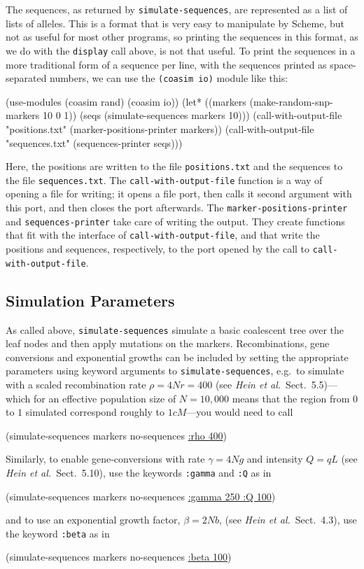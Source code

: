 \documentclass{manual}
\begin{document}
The sequences, as returned by \texttt{simulate-sequences}, are
represented as a list of lists of alleles.  This is a format that is
very easy to manipulate by Scheme, but not as useful for most other
programs, so printing the sequences in this format, as we do with the
\texttt{display} call above, is not that useful.  To print the
sequences in a more traditional form of a sequence per line, with the
sequences printed as space-separated numbers, we can use the
\texttt{(coasim io)} module like this:
\begin{code}
(use-modules (coasim rand) (coasim io))
(let* ((markers (make-random-snp-markers 10 0 1))
       (seqs (simulate-sequences markers 10)))
  (call-with-output-file "positions.txt" (marker-positions-printer markers))
  (call-with-output-file "sequences.txt" (sequences-printer seqs)))
\end{code}
Here, the positions are written to the file \texttt{positions.txt} and
the sequences to the file \texttt{sequences.txt}.  The
\texttt{call-with-output-file} function is a way of opening a file for
writing; it opens a file port, then calls it second argument with this
port, and then closes the port afterwards.  The
\texttt{marker-positions-printer} and \texttt{sequences-printer} take
care of writing the output.  They create functions that fit with the
interface of \texttt{call-with-output-file}, and that write the
positions and sequences, respectively, to the port opened by
the call to \texttt{call-with-output-file}.


\subsection{Simulation Parameters}
\label{sec:simul-param}

As called above, \texttt{simulate-sequences} simulate a basic
coalescent tree over the leaf nodes and then apply mutations on the
markers.  Recombinations, gene conversions and exponential growths can
be included by setting the appropriate parameters using keyword
arguments to \texttt{simulate-sequences}, e.g.\ to simulate with a
scaled recombination rate $\rho=4Nr=400$ (see \emph{Hein et al.}\ 
Sect.~5.5)---which for an effective population size of $N=10,000$
means that the region from $0$ to $1$ simulated correspond roughly to
$1cM$---you would need to call
\begin{code}
(simulate-sequences markers no-sequences \underline{:rho 400})
\end{code}

Similarly, to enable gene-conversions with rate $\gamma=4Ng$ and
intensity $Q=qL$ (see \emph{Hein et al.}\ Sect.~5.10), use the
keywords \texttt{:gamma} and \texttt{:Q} as in
\begin{code}
(simulate-sequences markers no-sequences \underline{:gamma 250 :Q 100})
\end{code}
and to use an exponential growth factor, $\beta=2Nb$, (see \emph{Hein
  et al.}\ Sect.~4.3), use the keyword \texttt{:beta} as in
\begin{code}
(simulate-sequences markers no-sequences \underline{:beta 100})
\end{code}
\end{document}
